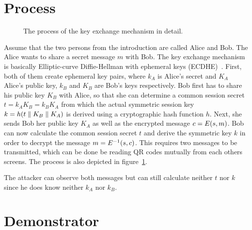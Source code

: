 
\section{Process}

\begin{figure}[t]
	\centering
	
	\caption{The process of the key exchange mechanism in detail.}%
	\label{fig:key-exchange-sequence}
\end{figure}

Assume that the two persons from the introduction are called Alice and Bob.
The Alice wants to share a secret message $m$ with Bob.
The key exchange mechanism is basically Elliptic-curve Diffie-Hellman with ephemeral keys (ECDHE)~\cite[56~pp.]{Brown:2009}.
First, both of them create ephemeral key pairs, where $k_A$ is Alice's secret and $K_A$ Alice's public key, $k_B$ and $K_B$ are Bob's keys respectively.
Bob first has to share his public key $K_B$ with Alice, so that she can determine a common session secret $t = k_A K_B = k_B K_A$ from which the actual symmetric session key $k = \Function{h}{t \concat K_B \concat K_A}$ is derived using a cryptographic hash function $h$.
Next, she sends Bob her public key $K_A$ as well as the encrypted message $c = \Function{E}{s, m}$.
Bob can now calculate the common session secret $t$ and derive the symmetric key $k$ in order to decrypt the message $m = \Function{E^{-1}}{s, c}$.
This requires two messages to be transmitted, which can be done be reading QR codes mutually from each others screens.
The process is also depicted in figure~\ref{fig:key-exchange-sequence}.

The attacker can observe both messages but can still calculate neither $t$ nor $k$ since he does know neither $k_A$ nor $k_B$.


\section{Demonstrator}

